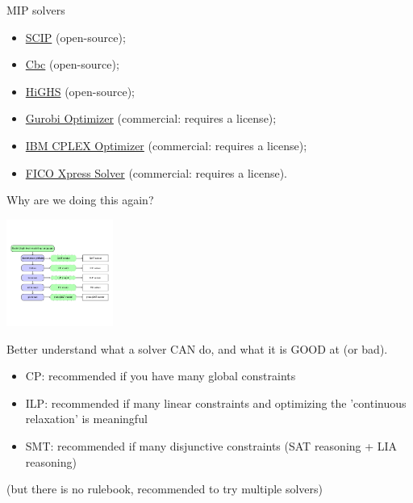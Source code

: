 \documentclass{cons-beamer}
\begin{document}
\begin{frame}{MIP solvers}
  \begin{itemize}
    \item \href{https://www.scipopt.org}{SCIP} (open-source);
    \item \href{https://github.com/coin-or/Cbc}{Cbc} (open-source);
    \item \href{https://highs.dev}{HiGHS} (open-source);
    \item \href{https://www.gurobi.com}{Gurobi Optimizer} (commercial:
      requires a license);
    \item \href{https://www.ibm.com/products/ilog-cplex-optimization-studio/cplex-optimizer}{IBM CPLEX Optimizer} (commercial: requires a license);
    \item \href{https://www.fico.com/en/products/fico-xpress-optimization}{FICO
        Xpress Solver} (commercial: requires a license).
  \end{itemize}
\end{frame}

\begin{frame}{Why are we doing this again?}
  \begin{center}
    \includegraphics[height=35mm, trim=30px 30px 30px 30px, clip]{images/ch6-logo.png}
  \end{center}
  \vfill

  Better understand what a solver CAN do, and what it is GOOD at (or bad).
  \begin{itemize}
    \item CP: recommended if you have many global constraints
    \item ILP: recommended if many linear constraints and optimizing the 'continuous relaxation' is meaningful
    \item SMT: recommended if many disjunctive constraints (SAT reasoning + LIA reasoning)
  \end{itemize}
  

  (but there is no rulebook, recommended to try multiple solvers)
\end{frame}
\end{document}
